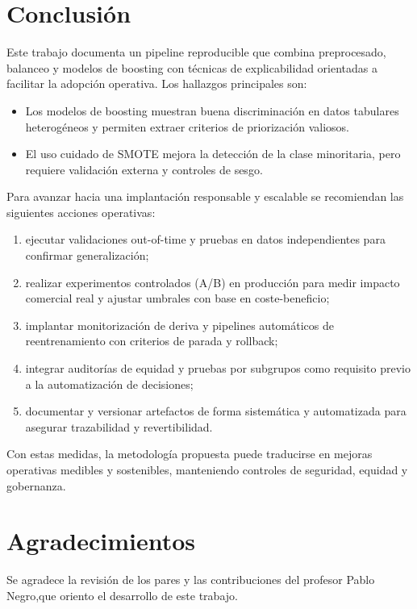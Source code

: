 \documentclass[12pt,a4paper]{article}
\begin{document}
\section{Conclusi\'on}
Este trabajo documenta un pipeline reproducible que combina preprocesado, balanceo y modelos de boosting con t\'ecnicas de explicabilidad orientadas a facilitar la adopci\'on operativa. Los hallazgos principales son:
\begin{itemize}[leftmargin=*]
  \item Los modelos de boosting muestran buena discriminaci\'on en datos tabulares heterog\'eneos y permiten extraer criterios de priorizaci\'on valiosos.
  \item El uso cuidado de SMOTE mejora la detecci\'on de la clase minoritaria, pero requiere validaci\'on externa y controles de sesgo.
\end{itemize}

Para avanzar hacia una implantaci\'on responsable y escalable se recomiendan las siguientes acciones operativas:
\begin{enumerate}[leftmargin=*]
  \item ejecutar validaciones out-of-time y pruebas en datos independientes para confirmar generalizaci\'on;
  \item realizar experimentos controlados (A/B) en producci\'on para medir impacto comercial real y ajustar umbrales con base en coste-beneficio;
  \item implantar monitorizaci\'on de deriva y pipelines autom\'aticos de reentrenamiento con criterios de parada y rollback;
  \item integrar auditor\'ias de equidad y pruebas por subgrupos como requisito previo a la automatizaci\'on de decisiones;
  \item documentar y versionar artefactos de forma sistem\'atica y automatizada para asegurar trazabilidad y revertibilidad.
\end{enumerate}

Con estas medidas, la metodolog\'ia propuesta puede traducirse en mejoras operativas medibles y sostenibles, manteniendo controles de seguridad, equidad y gobernanza.

\section*{Agradecimientos}
Se agradece la revisi\'on de los pares y las contribuciones del profesor Pablo Negro,que oriento el desarrollo de este trabajo.
\end{document}
